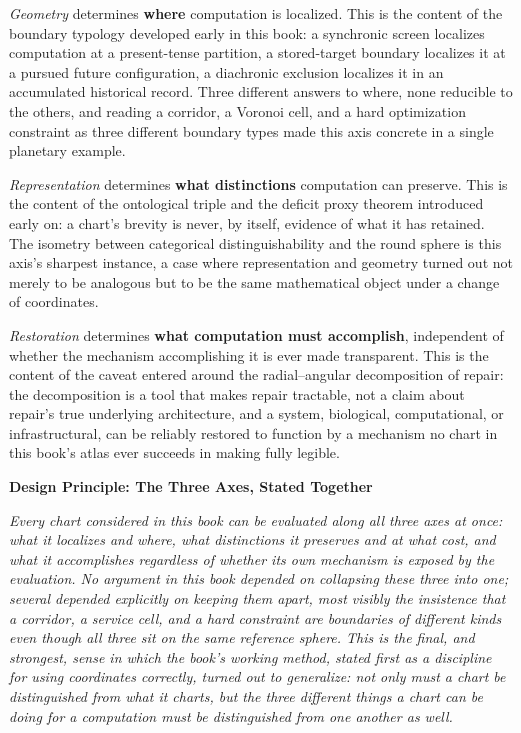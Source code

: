 \documentclass[11pt,fleqn]{book}
\numberwithin{equation}{chapter}
\newenvironment{principle}[1]
  {\begin{principleEnv}
   \noindent\textbf{Design Principle: #1}\par\smallskip\itshape}
  {\end{principleEnv}}
\theoremstyle{plain}
\theoremstyle{definition}
\theoremstyle{remark}
\begin{document}
\emph{Geometry} determines \textbf{where} computation is localized. This is the content of the boundary typology developed early in this book: a synchronic screen localizes computation at a present-tense partition, a stored-target boundary localizes it at a pursued future configuration, a diachronic exclusion localizes it in an accumulated historical record. Three different answers to where, none reducible to the others, and reading a corridor, a Voronoi cell, and a hard optimization constraint as three different boundary types made this axis concrete in a single planetary example.

\emph{Representation} determines \textbf{what distinctions} computation can preserve. This is the content of the ontological triple and the deficit proxy theorem introduced early on: a chart's brevity is never, by itself, evidence of what it has retained. The isometry between categorical distinguishability and the round sphere is this axis's sharpest instance, a case where representation and geometry turned out not merely to be analogous but to be the same mathematical object under a change of coordinates.

\emph{Restoration} determines \textbf{what computation must accomplish}, independent of whether the mechanism accomplishing it is ever made transparent. This is the content of the caveat entered around the radial--angular decomposition of repair: the decomposition is a tool that makes repair tractable, not a claim about repair's true underlying architecture, and a system, biological, computational, or infrastructural, can be reliably restored to function by a mechanism no chart in this book's atlas ever succeeds in making fully legible.

\begin{principle}{The Three Axes, Stated Together}
Every chart considered in this book can be evaluated along all three axes at once: what it localizes and where, what distinctions it preserves and at what cost, and what it accomplishes regardless of whether its own mechanism is exposed by the evaluation. No argument in this book depended on collapsing these three into one; several depended explicitly on keeping them apart, most visibly the insistence that a corridor, a service cell, and a hard constraint are boundaries of different kinds even though all three sit on the same reference sphere. This is the final, and strongest, sense in which the book's working method, stated first as a discipline for using coordinates correctly, turned out to generalize: not only must a chart be distinguished from what it charts, but the three different things a chart can be doing for a computation must be distinguished from one another as well.
\end{principle}
\end{document}

